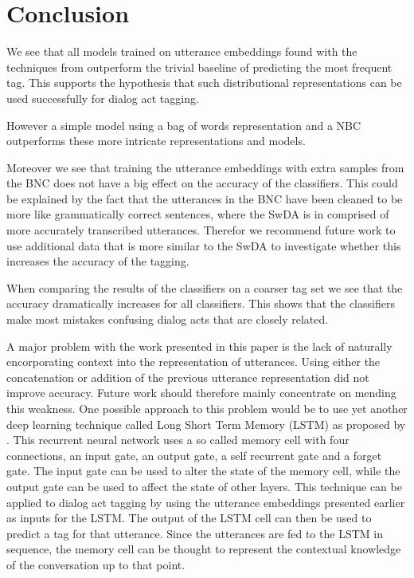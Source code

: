 \section{Conclusion}\label{sec:conclusion}
We see that all models trained on utterance embeddings found with the techniques from  outperform the trivial baseline of predicting the most frequent tag. This supports the hypothesis that such distributional representations can be used successfully for dialog act tagging.

However a simple model using a bag of words representation and a NBC outperforms these more intricate representations and models. 

Moreover we see that training the utterance embeddings with extra samples from the BNC does not have a big effect on the accuracy of the classifiers. This could be explained by the fact that the utterances in the BNC have been cleaned to be more like grammatically correct sentences, where the SwDA is in comprised of more accurately transcribed utterances. Therefor we recommend future work to use additional data that is more similar to the SwDA  to investigate whether this increases the accuracy of the tagging.

When comparing the results of the classifiers on a coarser tag set we see that the accuracy dramatically increases for all classifiers. This shows that the classifiers make most mistakes confusing dialog acts that are closely related. 

A major problem with the work presented in this paper is the lack of naturally encorporating context into the representation of utterances. Using either the concatenation or addition of the previous utterance representation did not improve accuracy. Future work should therefore mainly concentrate on mending this weakness. One possible approach to this problem would be to use yet another deep learning technique called Long Short Term Memory (LSTM) as proposed by . This recurrent neural network uses a so called memory cell with four connections, an input gate, an output gate, a self recurrent gate and a forget gate. The input gate can be used to alter the state of the memory cell, while the output gate can be used to affect the state of other layers. This technique can be applied to dialog act tagging by using the utterance embeddings presented earlier as inputs for the LSTM. The output of the LSTM cell can then be used to predict a tag for that utterance. Since the utterances are fed to the LSTM in sequence, the memory cell can be thought to represent the contextual knowledge of the conversation up to that point.

